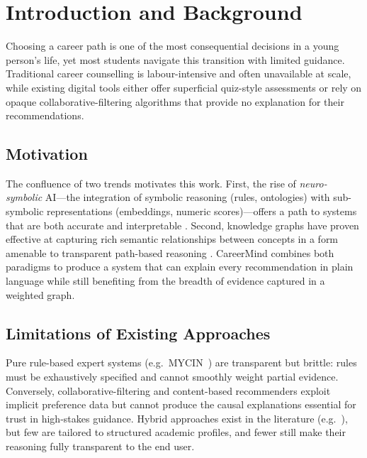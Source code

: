 \documentclass[runningheads]{llncs}
\begin{document}

\section{Introduction and Background}
\label{sec:intro}

Choosing a career path is one of the most consequential decisions in a young
person's life, yet most students navigate this transition with limited guidance.
Traditional career counselling is labour-intensive and often unavailable at
scale, while existing digital tools either offer superficial quiz-style
assessments or rely on opaque collaborative-filtering algorithms that provide
no explanation for their recommendations.

\subsection{Motivation}

The confluence of two trends motivates this work.  First, the rise of
\emph{neuro-symbolic} AI---the integration of symbolic reasoning (rules,
ontologies) with sub-symbolic representations (embeddings, numeric
scores)---offers a path to systems that are both accurate and interpretable
\cite{garcez2022neurosymbolic}.  Second, knowledge graphs have proven effective
at capturing rich semantic relationships between concepts in a form amenable to
transparent path-based reasoning \cite{ji2021survey}.
CareerMind combines both paradigms to produce a system that can explain every
recommendation in plain language while still benefiting from the breadth of
evidence captured in a weighted graph.

\subsection{Limitations of Existing Approaches}

Pure rule-based expert systems (e.g.\ MYCIN~\cite{shortliffe1974mycin}) are
transparent but brittle: rules must be exhaustively specified and cannot
smoothly weight partial evidence.  Conversely, collaborative-filtering and
content-based recommenders \cite{burke2002hybrid} exploit implicit preference
data but cannot produce the causal explanations essential for trust in high-stakes
guidance.  Hybrid approaches exist in the literature (e.g.\
\cite{chen2018knowme}), but few are tailored to structured academic profiles, and
fewer still make their reasoning fully transparent to the end user.
\end{document}

